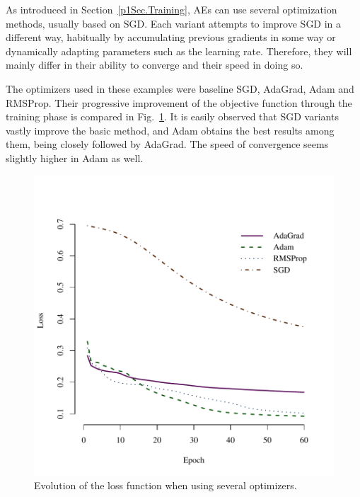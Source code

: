 As introduced in Section~\ref{p1Sec.Training}, AEs can use several optimization methods, usually based on SGD. Each variant attempts to improve SGD in a different way, habitually by accumulating previous gradients in some way or dynamically adapting parameters such as the learning rate. Therefore, they will mainly differ in their ability to converge and their speed in doing so.

The optimizers used in these examples were baseline SGD, AdaGrad, Adam and RMSProp. Their progressive improvement of the objective function through the training phase is compared in Fig.~\ref{p1Fig.opt.loss}. It is easily observed that SGD variants vastly improve the basic method, and Adam obtains the best results among them, being closely followed by AdaGrad. The speed of convergence seems slightly higher in Adam as well.

\begin{figure}[htbp]
  \includegraphics[width=\linewidth,trim={0 0 0 6em},clip]{optimizers_loss.pdf}
  \caption{\label{p1Fig.opt.loss}Evolution of the loss function when using several optimizers.}
\end{figure}



